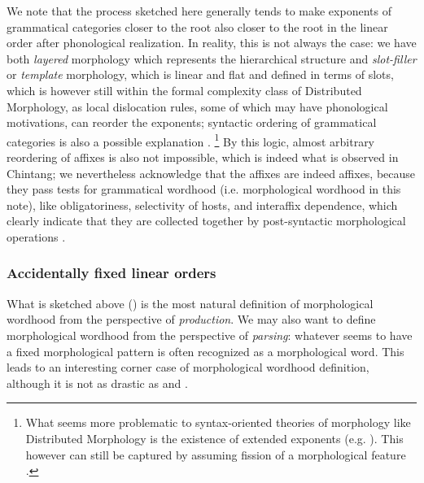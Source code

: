 \documentclass[a4paper, oneside, scheme=plain, 12pt]{article}
\begin{document}
We note that the process sketched here generally tends to 
make exponents of grammatical categories closer to the root also closer to the root
in the linear order after phonological realization.
In reality, this is not always the case:
we have both \emph{layered} morphology which represents the hierarchical structure
and \emph{slot-filler} or \emph{template} morphology, which is linear and flat and defined in terms of slots,
which is however still within the formal complexity class of Distributed Morphology,
as local dislocation rules, some of which may have phonological motivations,
can reorder the exponents;
syntactic ordering of grammatical categories is also a possible explanation
\citep{bye2020morpheme}.%
\footnote{
    What seems more problematic to syntax-oriented theories of morphology like Distributed Morphology
    is the existence of extended exponents (e.g. \citealt{bickel2007free}).
    This however can still be captured by assuming fission of a morphological feature \citep{bobaljik2017distributed}.
}
By this logic, almost arbitrary reordering of affixes is also not impossible,
which is indeed what is observed in Chintang;
we nevertheless acknowledge that the affixes are indeed affixes,
because they pass tests for grammatical wordhood (i.e. morphological wordhood in this note),
like obligatoriness, selectivity of hosts, and interaffix dependence,
which clearly indicate that they are collected together by post-syntactic morphological operations \citep{bickel2007free}.

\subsubsection{Accidentally fixed linear orders}\label{sec:morphological-wordhood-linear}

What is sketched above ()
is the most natural definition of morphological wordhood from the perspective of \emph{production}.
We may also want to define morphological wordhood from the perspective of \emph{parsing}:
whatever seems to have a fixed morphological pattern
is often recognized as a morphological word.
This leads to an interesting corner case of morphological wordhood definition,
although it is not as drastic as  and .
\end{document}
